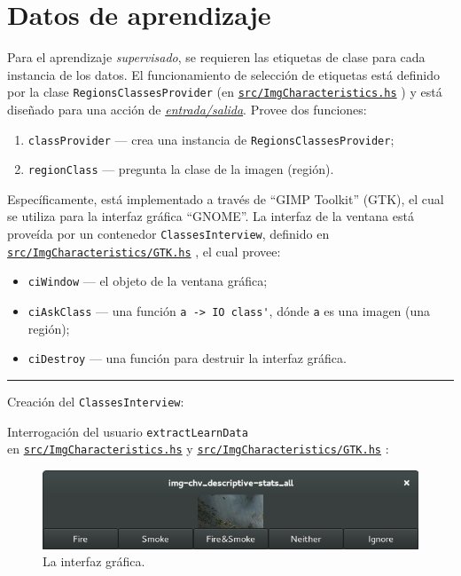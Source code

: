 \documentclass{article}
\newcommand{\crule}[2][1pt]
    {\begin{center}\rule{#2\textwidth}{#1}\end{center}}
\newcommand\refcode[2]{ \href{#1}{\texttt{#2}} }
\begin{document}
\section{Datos de aprendizaje}

Para el aprendizaje \emph{supervisado}, se requieren las etiquetas de clase para cada instancia de los datos. El funcionamiento de selección de etiquetas está definido por la clase \verb|RegionsClassesProvider| (en \refcode{\ImgCharacteristics}{src/ImgCharacteristics.hs}) y está diseñado para una acción de \href{https://www.haskell.org/tutorial/io.html}{\emph{entrada/salida}}. Provee dos funciones:
\begin{enumerate}
    \item \verb|classProvider| --- crea una instancia de \verb|RegionsClassesProvider|;
    \item \verb|regionClass| --- pregunta la clase de la imagen (región).
\end{enumerate}

Específicamente, está implementado a través de ``GIMP Toolkit'' (GTK), el cual se utiliza para la interfaz gráfica ``GNOME''. La interfaz de la ventana está proveída por un contenedor \verb|ClassesInterview|, definido en \\ \refcode{\GTK}{src/ImgCharacteristics/GTK.hs}, el cual provee:
\begin{itemize}
    \item \verb|ciWindow| --- el objeto de la ventana gráfica;
    \item \verb|ciAskClass| --- una función \verb|a -> IO class'|, dónde \verb|a| es una 
                                imagen (una región);
    \item \verb|ciDestroy| --- una función para destruir la interfaz gráfica.
\end{itemize}

\crule{1}
\medskip
Creación del \verb|ClassesInterview|:
\medskip



\medskip
Interrogación del usuario \verb|extractLearnData| \\ en \refcode{ImgCharacteristics}{src/ImgCharacteristics.hs} y \refcode{\GTK}{src/ImgCharacteristics/GTK.hs}:
\medskip



\begin{figure}[h]
    \centering
    \includegraphics[width=\textwidth]{interview.png}
    \caption{La interfaz gráfica.}
\end{figure}
\end{document}
